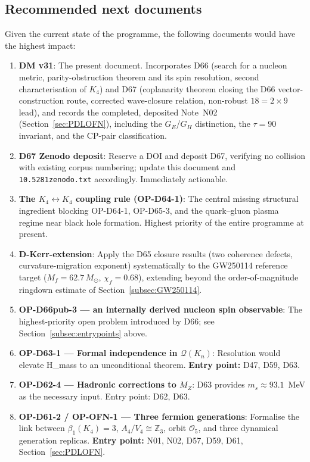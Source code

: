 \documentclass[11pt,a4paper]{article}
\theoremstyle{plain}
\theoremstyle{definition}
\theoremstyle{remark}
\begin{document}
\subsection{Recommended next documents}
\label{subsec:nextdocs}
Given the current state of the programme, the following documents would have the highest impact:

\begin{enumerate}
\item \textbf{DM v31}: The present document. Incorporates D66 (search for a nucleon metric, parity-obstruction theorem and its spin resolution, second characterisation of $K_4$) and D67 (coplanarity theorem closing the D66 vector-construction route, corrected wave-closure relation, non-robust $18=2\times9$ lead), and records the completed, deposited Note~N02 (Section~\ref{sec:PDLOFN}), including the $G_E$/$G_H$ distinction, the $\tau=90$ invariant, and the CP-pair classification.
\item \textbf{D67 Zenodo deposit}: Reserve a DOI and deposit D67, verifying no collision with existing corpus numbering; update this document and \texttt{10.5281zenodo.txt} accordingly. Immediately actionable.
\item \textbf{The $K_4\leftrightarrow K_4$ coupling rule (OP-D64-1)}: The central missing structural ingredient blocking OP-D64-1, OP-D65-3, and the quark--gluon plasma regime near black hole formation. Highest priority of the entire programme at present.
\item \textbf{D-Kerr-extension}: Apply the D65 closure results (two coherence defects, curvature-migration exponent) systematically to the GW250114 reference target ($M_f=62.7\,M_\odot$, $\chi_f=0.68$), extending beyond the order-of-magnitude ringdown estimate of Section~\ref{subsec:GW250114}.
\item \textbf{OP-D66pub-3 --- an internally derived nucleon spin observable}: The highest-priority open problem introduced by D66; see Section~\ref{subsec:entrypoints} above.
\item \textbf{OP-D63-1 --- Formal independence in $\mathcal{Q}(K_n)$}: Resolution would elevate H\_mass to an unconditional theorem. \textbf{Entry point:} D47, D59, D63.
\item \textbf{OP-D62-4 --- Hadronic corrections to $M_Z$}: D63 provides $m_s \approx 93.1$~MeV as the necessary input. Entry point: D62, D63.
\item \textbf{OP-D61-2 / OP-OFN-1 --- Three fermion generations}: Formalise the link between $\beta_1(K_4) = 3$, $A_4/V_4 \cong \mathbb{Z}_3$, orbit $\mathcal{O}_5$, and three dynamical generation replicas. \textbf{Entry point:} N01, N02, D57, D59, D61, Section~\ref{sec:PDLOFN}.

\end{enumerate}
\end{document}
